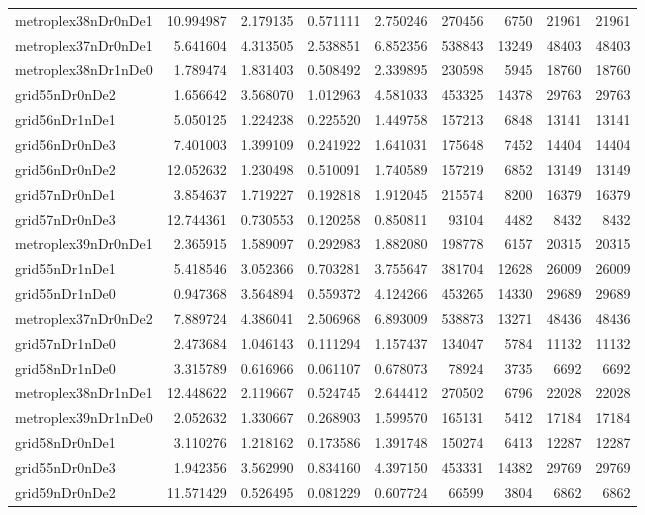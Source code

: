 \documentclass[../../../thesis.tex]{subfiles}
\begin{document}
\begin{longtable}{|l|r|r|r|r|r|r|r|r|}
metroplex38nDr0nDe1 & 10.994987 & 2.179135 & 0.571111 & 2.750246 & 270456 & 6750 & 21961 & 21961 \\
metroplex37nDr0nDe1 & 5.641604 & 4.313505 & 2.538851 & 6.852356 & 538843 & 13249 & 48403 & 48403 \\
metroplex38nDr1nDe0 & 1.789474 & 1.831403 & 0.508492 & 2.339895 & 230598 & 5945 & 18760 & 18760 \\
grid55nDr0nDe2 & 1.656642 & 3.568070 & 1.012963 & 4.581033 & 453325 & 14378 & 29763 & 29763 \\
grid56nDr1nDe1 & 5.050125 & 1.224238 & 0.225520 & 1.449758 & 157213 & 6848 & 13141 & 13141 \\
grid56nDr0nDe3 & 7.401003 & 1.399109 & 0.241922 & 1.641031 & 175648 & 7452 & 14404 & 14404 \\
grid56nDr0nDe2 & 12.052632 & 1.230498 & 0.510091 & 1.740589 & 157219 & 6852 & 13149 & 13149 \\
grid57nDr0nDe1 & 3.854637 & 1.719227 & 0.192818 & 1.912045 & 215574 & 8200 & 16379 & 16379 \\
grid57nDr0nDe3 & 12.744361 & 0.730553 & 0.120258 & 0.850811 & 93104 & 4482 & 8432 & 8432 \\
metroplex39nDr0nDe1 & 2.365915 & 1.589097 & 0.292983 & 1.882080 & 198778 & 6157 & 20315 & 20315 \\
grid55nDr1nDe1 & 5.418546 & 3.052366 & 0.703281 & 3.755647 & 381704 & 12628 & 26009 & 26009 \\
grid55nDr1nDe0 & 0.947368 & 3.564894 & 0.559372 & 4.124266 & 453265 & 14330 & 29689 & 29689 \\
metroplex37nDr0nDe2 & 7.889724 & 4.386041 & 2.506968 & 6.893009 & 538873 & 13271 & 48436 & 48436 \\
grid57nDr1nDe0 & 2.473684 & 1.046143 & 0.111294 & 1.157437 & 134047 & 5784 & 11132 & 11132 \\
grid58nDr1nDe0 & 3.315789 & 0.616966 & 0.061107 & 0.678073 & 78924 & 3735 & 6692 & 6692 \\
metroplex38nDr1nDe1 & 12.448622 & 2.119667 & 0.524745 & 2.644412 & 270502 & 6796 & 22028 & 22028 \\
metroplex39nDr1nDe0 & 2.052632 & 1.330667 & 0.268903 & 1.599570 & 165131 & 5412 & 17184 & 17184 \\
grid58nDr0nDe1 & 3.110276 & 1.218162 & 0.173586 & 1.391748 & 150274 & 6413 & 12287 & 12287 \\
grid55nDr0nDe3 & 1.942356 & 3.562990 & 0.834160 & 4.397150 & 453331 & 14382 & 29769 & 29769 \\
grid59nDr0nDe2 & 11.571429 & 0.526495 & 0.081229 & 0.607724 & 66599 & 3804 & 6862 & 6862 \\

\end{longtable}
\end{document}
